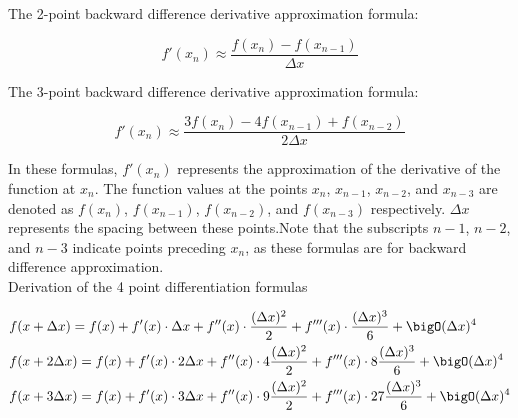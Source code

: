 \documentclass[12pt, a4paper]{article}
\numberwithin{equation}{section}
\begin{document}
The 2-point backward difference derivative approximation formula:

\begin{equation}
f'(x_n) \approx \frac{{f(x_n) - f(x_{n-1})}}{{\Delta x}}
\end{equation}

The 3-point backward difference derivative approximation formula:

\begin{equation}
f'(x_n) \approx \frac{{3f(x_n) - 4f(x_{n-1}) + f(x_{n-2})}}{{2\Delta x}}
\end{equation}

In these formulas, \(f'(x_n)\) represents the approximation of the derivative of the function at \(x_n\). The function values at the points \(x_n\), \(x_{n-1}\), \(x_{n-2}\), and \(x_{n-3}\) are denoted as \(f(x_n)\), \(f(x_{n-1})\), \(f(x_{n-2})\), and \(f(x_{n-3})\) respectively. \(\Delta x\) represents the spacing between these points.Note that the subscripts \(n-1\), \(n-2\), and \(n-3\) indicate points preceding \(x_n\), as these formulas are for backward difference approximation.\\

Derivation of the 4 point differentiation formulas

\begin{align}
& f(x+\Delta x)=f(x)+f^{\prime}(x) \cdot \Delta x+f^{\prime \prime}(x) \cdot \frac{(\Delta x)^{2}}{2}+f^{\prime \prime \prime}(x) \cdot \frac{(\Delta x)^{3}}{6}+\bigO(\Delta x)^{4} \\
& f(x+2 \Delta x)=f(x)+f^{\prime}(x) \cdot 2 \Delta x+f^{\prime \prime}(x) \cdot 4\frac{ (\Delta x)^{2}}{2}+f^{\prime \prime \prime}(x) \cdot 8 \frac{(\Delta x)^{3}}{6}+\bigO(\Delta x)^{4} \\
& f(x+3 \Delta x)=f(x)+f^{\prime}(x) \cdot 3 \Delta x+f^{\prime \prime}(x) \cdot 9\frac{(\Delta x)^{2}}{2}+f^{\prime \prime \prime}(x) \cdot 27 \frac{(\Delta x)^{3}}{6}+\bigO(\Delta x)^{4} 
\end{align}
\end{document}
